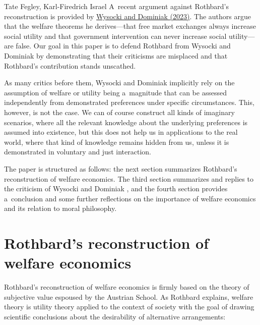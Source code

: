 \begin{artengenv2auth}{Tate Fegley, Karl-Firedrich Israel}
A~recent argument against Rothbard's reconstruction is provided by \href{https://www.zotero.org/google-docs/?CcG5f3}{Wysocki and}\href{https://www.zotero.org/google-docs/?CcG5f3}{ Dominiak }\label{ref:RNDvZAcMn6xM2}\href{https://www.zotero.org/google-docs/?CcG5f3}{(2023)}. The authors argue that the welfare theorems he derives---that free market exchanges always increase social utility and that government intervention can never increase social utility---are false. Our goal in this paper is to defend Rothbard from Wysocki and Dominiak 
\parencite*[][]{wysocki_how_2023} %
 by demonstrating that their criticisms are misplaced and that Rothbard's contribution stands unscathed.



As many critics before them, Wysocki and Dominiak implicitly rely on the assumption of welfare or utility being a~magnitude that can be assessed independently from demonstrated preferences under specific circumstances. This, however, is not the case. We can of course construct all kinds of imaginary scenarios, where all the relevant knowledge about the underlying preferences is assumed into existence, but this does not help us in applications to the real world, where that kind of knowledge remains hidden from us, unless it is demonstrated in voluntary and just interaction.



The paper is structured as follows: the next section summarizes Rothbard's reconstruction of welfare economics. The third section summarizes and replies to the criticism of Wysocki and Dominiak 
\parencite*[][]{wysocki_how_2023}, %
 and the fourth section provides a~conclusion and some further reflections on the importance of welfare economics and its relation to moral philosophy.



\section{Rothbard's reconstruction of welfare economics}

Rothbard's reconstruction of welfare economics is firmly based on the theory of subjective value espoused by the Austrian School. As Rothbard explains, welfare theory is utility theory applied to the context of society with the goal of drawing scientific conclusions about the desirability of alternative arrangements:




\end{artengenv2auth}
